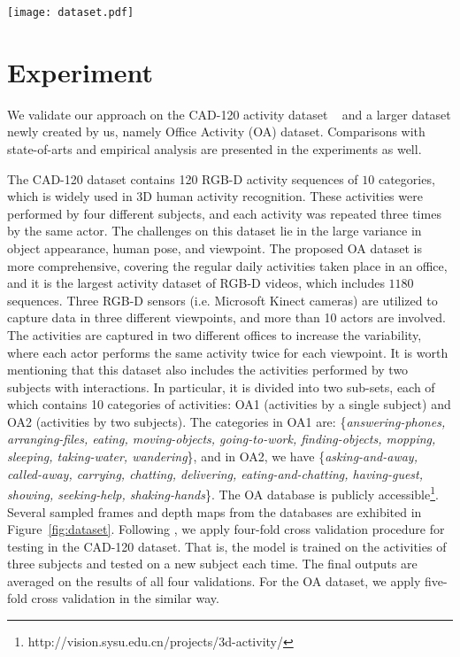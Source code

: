 \documentclass{sig-alternate}
\begin{document}
\begin{figure*}[!htb]
\centering
\texttt{[image: dataset.pdf]}
\caption{Activity examples from the testing databases. Several sampled frames and depth maps are presented. (a) CAD-120, (b) OA1, (c) OA2, respectively, show two activities of the same category selected from the three databases.}\label{fig:dataset}
\end{figure*}

\section{Experiment}
\label{sec:exper}
We validate our approach on the CAD-120 activity dataset ~\cite{CADIJRR2013} and a larger dataset newly created by us, namely Office Activity (OA) dataset. Comparisons with state-of-arts and empirical analysis are presented in the experiments as well.

The CAD-120 dataset contains 120 RGB-D activity sequences of $10$ categories, which is widely used in 3D human activity recognition. These activities were performed by four different subjects, and each activity was repeated three times by the same actor. The challenges on this dataset lie in the large variance in object appearance, human pose, and viewpoint. The proposed OA dataset is more comprehensive, covering the regular daily activities taken place in an office, and it is the largest activity dataset of RGB-D videos, which includes $1180$ sequences. Three RGB-D sensors (i.e. Microsoft Kinect cameras) are utilized to capture data in three different viewpoints, and more than 10 actors are involved. The activities are captured in two different offices to increase the variability, where each actor performs the same activity twice for each viewpoint. It is worth mentioning that this dataset also includes the activities performed by two subjects with interactions. In particular,  it is divided into two sub-sets, each of which contains 10 categories of activities: OA1 (activities by a single subject) and OA2 (activities by two subjects). The categories in OA1 are: \{{\em answering-phones, arranging-files, eating, moving-objects, going-to-work, finding-objects, mopping, sleeping, taking-water, wandering}\}, and in OA2, we have \{{\em asking-and-away, called-away, carrying, chatting, delivering, eating-and-chatting, having-guest, showing, seeking-help, shaking-hands}\}. The OA database is publicly accessible\footnote{http://vision.sysu.edu.cn/projects/3d-activity/}. Several sampled frames and depth maps from the databases are exhibited in Figure~\ref{fig:dataset}. 
Following \cite{CADIJRR2013}, we apply four-fold cross validation procedure for testing in the CAD-120 dataset. That is, the model is trained on the activities of three subjects and tested on a new subject each time. The final outputs are averaged on the results of all four validations. For the OA dataset, we apply five-fold cross validation in the similar way.
\end{document}

